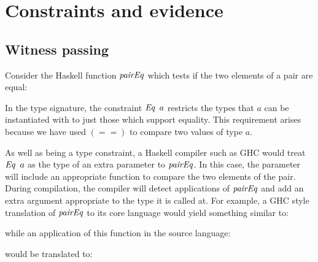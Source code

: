 \clearpage{}
\section{Constraints and evidence}
\label{Core:Witnesses}

\subsection{Witness passing}
\label{Core:Witnesses:evidence}
Consider the Haskell function $\operatorname{\mathit{pairEq}}$ which tests if the two elements of a pair are equal:


In the type signature, the constraint $\operatorname{\mathit{Eq}} \ a$ restricts the types that $a$ can be instantiated with to just those which support equality. This requirement arises because we have used $(==)$ to compare two values of type $a$.

As well as being a type constraint, a Haskell compiler such as GHC would treat $\operatorname{\mathit{Eq}} \ a$ as the type of an extra parameter to $\operatorname{\mathit{pairEq}}$. In this case, the parameter will include an appropriate function to compare the two elements of the pair. During compilation, the compiler will detect applications of $\operatorname{\mathit{pairEq}}$ and add an extra argument appropriate to the type it is called at. For example, a GHC style translation of $\operatorname{\mathit{pairEq}}$ to its core language \cite{hall:type-classes} would yield something similar to:


\vspace{-3ex}

while an application of this function in the source language:


would be translated to:


